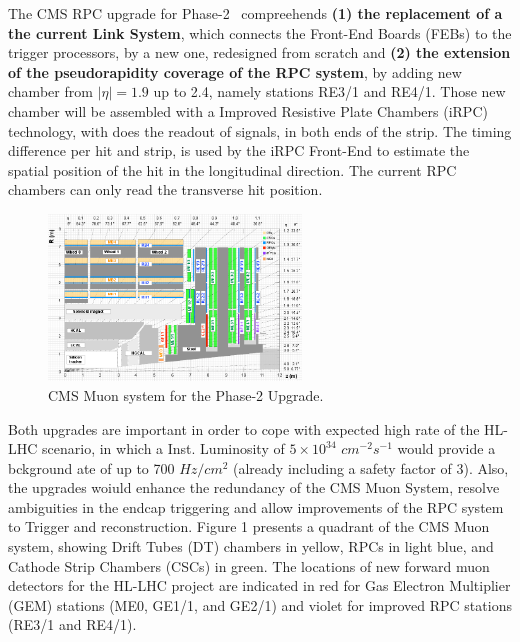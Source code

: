 The CMS RPC upgrade for Phase-2~\cite{muon_tdr} compreehends \textbf{(1) the replacement of a the current Link System}, which connects the Front-End Boards (FEBs) to the trigger processors, by a new one, redesigned from scratch and \textbf{(2) the extension of the pseudorapidity coverage of the RPC system}, by adding new chamber from $|\eta| = 1.9$ up to 2.4, namely stations RE3/1 and RE4/1. Those new chamber will be assembled with a Improved Resistive Plate Chambers (iRPC) technology, with does the readout of signals, in both ends of the strip. The timing difference per hit and strip, is used by the iRPC Front-End to estimate the spatial position of the hit in the longitudinal direction. The current RPC chambers can only read the transverse hit position.

\begin{figure}
    \includegraphics[width=0.6\textwidth]{uioposter-images/cms_muon}
    \caption{CMS Muon system for the Phase-2 Upgrade.}
    \label{cms_muon_upgrade}
\end{figure}


Both upgrades are important in order to cope with expected high rate of the HL-LHC scenario, in which a Inst. Luminosity of $5 \times 10^{34}$ $cm^{-2}s^{-1}$ would provide a bckground ate of up to 700 $Hz/cm^2$ (already including a safety factor of 3). Also, the upgrades woiuld enhance the redundancy of the CMS Muon System, resolve ambiguities in the endcap triggering and allow improvements of the RPC system to Trigger and reconstruction. Figure 1 presents a quadrant of the CMS Muon system, showing Drift Tubes (DT) chambers in yellow, RPCs in light blue, and Cathode Strip Chambers (CSCs) in green. The locations of new forward muon detectors for the HL-LHC project are indicated in red for Gas Electron Multiplier (GEM) stations (ME0, GE1/1, and GE2/1) and violet for improved RPC stations (RE3/1 and RE4/1).

